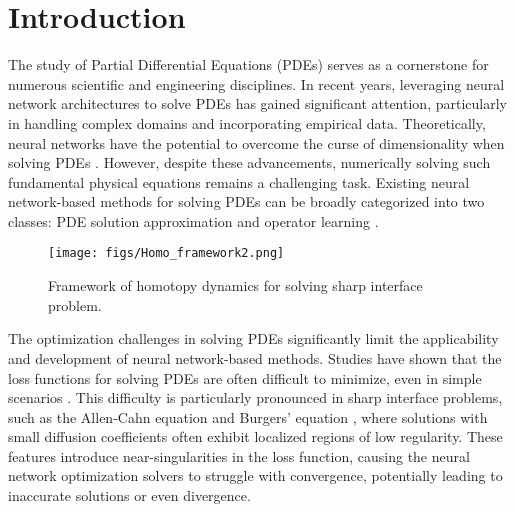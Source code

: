 \section{Introduction}
The study of Partial Differential Equations (PDEs) serves as a cornerstone for numerous scientific and engineering disciplines. In recent years, leveraging neural network architectures to solve PDEs has gained significant attention, particularly in handling complex domains and incorporating empirical data. Theoretically, neural networks have the potential to overcome the curse of dimensionality when solving PDEs \cite{han2018solving,siegel2020approximation,lu2021priori,yang2022approximation}. However, despite these advancements, numerically solving such fundamental physical equations remains a challenging task.
Existing neural network-based methods for solving PDEs can be broadly categorized into two classes: PDE solution approximation \cite{e2018deep,raissi2019unified,wan,karniadakis2021physicsinformed,cuomo2022scientific,chen2022bridging,dong2023method,sun2024local,chen2024quantifying} and operator learning \cite{lu2021deeponet,li2021fourier,haonewton}.


\begin{figure}[t]
    \centering
    \texttt{[image: figs/Homo\_framework2.png]}
    \caption{Framework of homotopy dynamics for solving sharp interface problem.}
    \label{fig:homotopy_dynamics_framework}
\end{figure}


The optimization challenges in solving PDEs significantly limit the applicability and development of neural network-based methods. Studies have shown that the loss functions for solving PDEs are often difficult to minimize, even in simple scenarios \cite{krishnapriyan2021characterizing,rathore2024challenges,xu2024overview,chen2024quantifying,chen2024automatic}. This difficulty is particularly pronounced in sharp interface problems, such as the Allen-Cahn equation \cite{allen1975coherent} and Burgers' equation \cite{burgers1948mathematical}, where solutions with small diffusion coefficients often exhibit localized regions of low regularity. These features introduce near-singularities in the loss function, causing the neural network optimization solvers to struggle with convergence, potentially leading to inaccurate solutions or even divergence.


